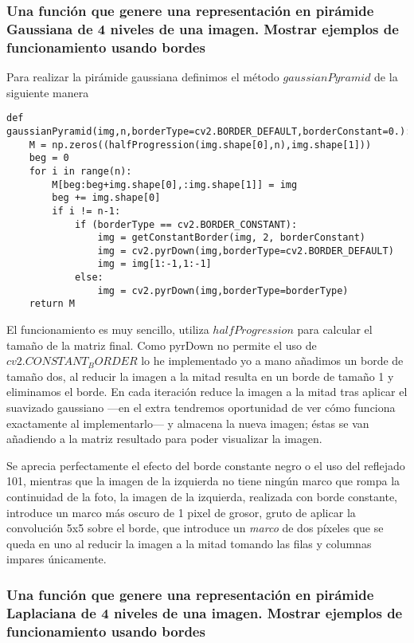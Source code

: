 \documentclass{article}
\newcommand{\img}[2]{
\noindent\makebox[\textwidth][c]{\texttt{[image: \#1]}}%
}
\begin{document}
\img{eximg/ej6}{0.8}

\subsubsection{Una función que genere una representación en pirámide Gaussiana de 4 niveles de una imagen. Mostrar ejemplos de funcionamiento usando bordes}

Para realizar la pirámide gaussiana definimos el método $gaussianPyramid$ de la siguiente manera

\begin{lstlisting}
def gaussianPyramid(img,n,borderType=cv2.BORDER_DEFAULT,borderConstant=0.):
    M = np.zeros((halfProgression(img.shape[0],n),img.shape[1]))
    beg = 0
    for i in range(n):
        M[beg:beg+img.shape[0],:img.shape[1]] = img
        beg += img.shape[0]
        if i != n-1:
            if (borderType == cv2.BORDER_CONSTANT):
                img = getConstantBorder(img, 2, borderConstant)
                img = cv2.pyrDown(img,borderType=cv2.BORDER_DEFAULT)
                img = img[1:-1,1:-1]
            else:
                img = cv2.pyrDown(img,borderType=borderType)
    return M
\end{lstlisting}

El funcionamiento es muy sencillo, utiliza $halfProgression$ para calcular el tamaño de la matriz final. Como pyrDown no permite el uso de $cv2.CONSTANT_BORDER$ lo he implementado yo a mano añadimos un borde de tamaño dos, al reducir la imagen a la mitad resulta en un borde de tamaño 1 y eliminamos el borde. En cada iteración reduce la imagen a la mitad tras aplicar el suavizado gaussiano ---en el extra tendremos oportunidad de ver cómo funciona exactamente al implementarlo--- y almacena la nueva imagen; éstas se van añadiendo a la matriz resultado para poder visualizar la imagen.

\img{eximg/ej7}{1}

Se aprecia perfectamente el efecto del borde constante negro o el uso del reflejado 101, mientras que la imagen de la izquierda no tiene ningún marco que rompa la continuidad de la foto, la imagen de la izquierda, realizada con borde constante, introduce un marco más oscuro de 1 pixel de grosor, gruto de aplicar la convolución 5x5 sobre el borde, que introduce un \textit{marco} de dos píxeles que se queda en uno al reducir la imagen a la mitad tomando las filas y columnas impares únicamente.

\subsubsection{Una función que genere una representación en pirámide Laplaciana de 4 niveles de una imagen. Mostrar ejemplos de funcionamiento usando bordes}
\end{document}
